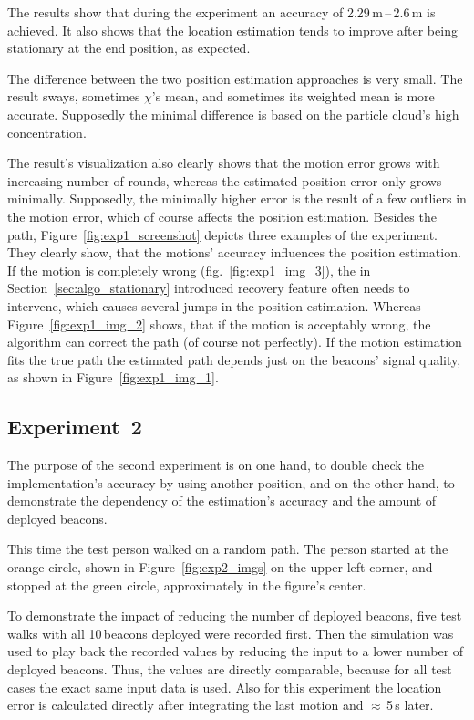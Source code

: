 The results show that during the experiment an accuracy of 2.29\,m\,--\,2.6\,m is achieved. It also shows that the location estimation tends to improve after being stationary at the end position, as expected.

The difference between the two position estimation approaches is very small. The result sways, sometimes $\chi$'s mean, and sometimes its weighted mean is more accurate. Supposedly the minimal difference is based on the particle cloud's high concentration.

The result's visualization also clearly shows that the motion error grows with increasing number of rounds, whereas the estimated position error only grows minimally. Supposedly, the minimally higher error is the result of a few outliers in the motion error, which of course affects the position estimation. Besides the path, Figure~\ref{fig:exp1_screenshot} depicts three examples of the experiment. They clearly show, that the motions' accuracy influences the position estimation. If the motion is completely wrong (fig.\ \ref{fig:exp1_img_3}), the in Section~\ref{sec:algo_stationary} introduced recovery feature often needs to intervene, which causes several jumps in the position estimation. Whereas Figure~\ref{fig:exp1_img_2} shows, that if the motion is acceptably wrong, the algorithm can correct the path (of course not perfectly). If the motion estimation fits the true path the estimated path depends just on the beacons' signal quality, as shown in Figure~\ref{fig:exp1_img_1}.

\subsection*{Experiment~2}
The purpose of the second experiment is on one hand, to double check the implementation's accuracy by using another position, and on the other hand, to demonstrate the dependency of the estimation's accuracy and the amount of deployed beacons.

This time the test person walked on a random path. The person started at the orange circle, shown in Figure~\ref{fig:exp2_imgs} on the upper left corner, and stopped at the green circle, approximately in the figure's center.

To demonstrate the impact of reducing the number of deployed beacons, five test walks with all 10\,beacons deployed were recorded first. Then the simulation was used to play back the recorded values by reducing the input to a lower number of deployed beacons. Thus, the values are directly comparable, because for all test cases the exact same input data is used. Also for this experiment the location error is calculated directly after integrating the last motion and $\approx$\,5\,s later.

